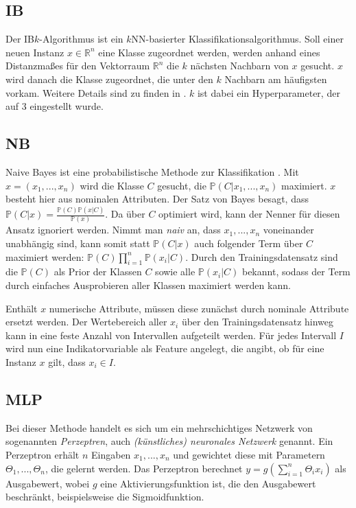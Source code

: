 \subsection{\acl{IB}}
Der IB$k$-Algorithmus ist ein $k$NN-basierter Klassifikationsalgorithmus. Soll einer neuen Instanz $x \in \mathbb{R}^n$ eine Klasse zugeordnet werden, werden anhand eines Distanzmaßes für den Vektorraum $\mathbb{R}^n$ die $k$ nächsten Nachbarn von $x$ gesucht. $x$ wird danach die Klasse zugeordnet, die unter den $k$ Nachbarn am häufigsten vorkam. Weitere Details sind zu finden in \cite{Aha1991}.
$k$ ist dabei ein Hyperparameter, der auf 3 eingestellt wurde.
\subsection{\acf{NB}}
Naive Bayes ist eine probabilistische Methode zur Klassifikation \cite{John1995}. Mit $x = (x_1, ..., x_n)$ wird die Klasse $C$ gesucht, die $\mathbb{P}(C | x_1, ..., x_n)$ maximiert. $x$ besteht hier aus nominalen Attributen. Der Satz von Bayes besagt, dass $\mathbb{P}(C|x) = \frac{\mathbb{P}(C) \mathbb{P}(x | C)}{\mathbb{P}(x)}$. Da über $C$ optimiert wird, kann der Nenner für diesen Ansatz ignoriert werden. Nimmt man \textit{naiv} an, dass $x_1, ..., x_n$ voneinander unabhängig sind, kann somit statt $\mathbb{P}(C | x)$ auch folgender Term über $C$ maximiert werden: $\mathbb{P}(C) \prod_{i=1}^{n} \mathbb{P}(x_i | C)$. Durch den Trainingsdatensatz sind die $\mathbb{P}(C)$ als Prior der Klassen $C$ sowie alle $\mathbb{P}(x_i | C)$ bekannt, sodass der Term durch einfaches Ausprobieren aller Klassen maximiert werden kann.

Enthält $x$ numerische Attribute, müssen diese zunächst durch nominale Attribute ersetzt werden. Der Wertebereich aller $x_i$ über den Trainingsdatensatz hinweg kann in eine feste Anzahl von Intervallen aufgeteilt werden. Für jedes Intervall $I$ wird nun eine Indikatorvariable als Feature angelegt, die angibt, ob für eine Instanz $x$ gilt, dass $x_i \in I$.
\subsection{\acf{MLP}}
Bei dieser Methode handelt es sich um ein mehrschichtiges Netzwerk von sogenannten \textit{Perzeptren}, auch \textit{(künstliches) neuronales Netzwerk} genannt. Ein Perzeptron erhält $n$ Eingaben $x_1, ..., x_n$ und gewichtet diese mit Parametern $\Theta_1, ..., \Theta_n$, die gelernt werden. Das Perzeptron berechnet $y = g(\sum_{i=1}^{n} \Theta_i x_i)$ als Ausgabewert, wobei $g$ eine Aktivierungsfunktion ist, die den Ausgabewert beschränkt, beispielsweise die Sigmoidfunktion.

